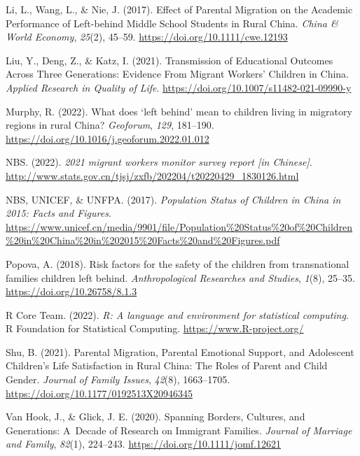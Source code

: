 \documentclass[
  man]{apa7}
\newlength{\cslhangindent}
\newlength{\cslentryspacingunit} %
\newenvironment{CSLReferences}[2] %
 {%
  \setlength{\parindent}{0pt}
  \ifodd #1
  \let\oldpar\par
  \def\par{\hangindent=\cslhangindent\oldpar}
  \fi
  \setlength{\parskip}{#2\cslentryspacingunit}
 }%
 {}
\begin{document}
\begin{CSLReferences}{1}{0}
\leavevmode{}%
Li, L., Wang, L., \& Nie, J. (2017). Effect of Parental Migration on the Academic Performance of Left-behind Middle School Students in Rural China. \emph{China \& World Economy}, \emph{25}(2), 45--59. \url{https://doi.org/10.1111/cwe.12193}

\leavevmode{}%
Liu, Y., Deng, Z., \& Katz, I. (2021). Transmission of Educational Outcomes Across Three Generations: Evidence From Migrant Workers{'} Children in China. \emph{Applied Research in Quality of Life}. \url{https://doi.org/10.1007/s11482-021-09990-y}

\leavevmode{}%
Murphy, R. (2022). What does {`}left behind{'} mean to children living in migratory regions in rural China? \emph{Geoforum}, \emph{129}, 181--190. \url{https://doi.org/10.1016/j.geoforum.2022.01.012}

\leavevmode{}%
NBS. (2022). \emph{2021 migrant workers monitor survey report {[}in Chinese{]}}. \url{http://www.stats.gov.cn/tjsj/zxfb/202204/t20220429_1830126.html}

\leavevmode{}%
NBS, UNICEF, \& UNFPA. (2017). \emph{Population Status of Children in China in 2015: Facts and Figures}. \url{https://www.unicef.cn/media/9901/file/Population\%20Status\%20of\%20Children\%20in\%20China\%20in\%202015\%20Facts\%20and\%20Figures.pdf}

\leavevmode{}%
Popova, A. (2018). Risk factors for the safety of the children from transnational families children left behind. \emph{Anthropological Researches and Studies}, \emph{1}(8), 25--35. \url{https://doi.org/10.26758/8.1.3}

\leavevmode{}%
R Core Team. (2022). \emph{R: A language and environment for statistical computing}. R Foundation for Statistical Computing. \url{https://www.R-project.org/}

\leavevmode{}%
Shu, B. (2021). Parental Migration, Parental Emotional Support, and Adolescent Children{'}s Life Satisfaction in Rural China: The Roles of Parent and Child Gender. \emph{Journal of Family Issues}, \emph{42}(8), 1663--1705. \url{https://doi.org/10.1177/0192513X20946345}

\leavevmode{}%
Van Hook, J., \& Glick, J. E. (2020). Spanning Borders, Cultures, and Generations: A~Decade of Research on Immigrant Families. \emph{Journal of Marriage and Family}, \emph{82}(1), 224--243. \url{https://doi.org/10.1111/jomf.12621}


\end{CSLReferences}
\end{document}
